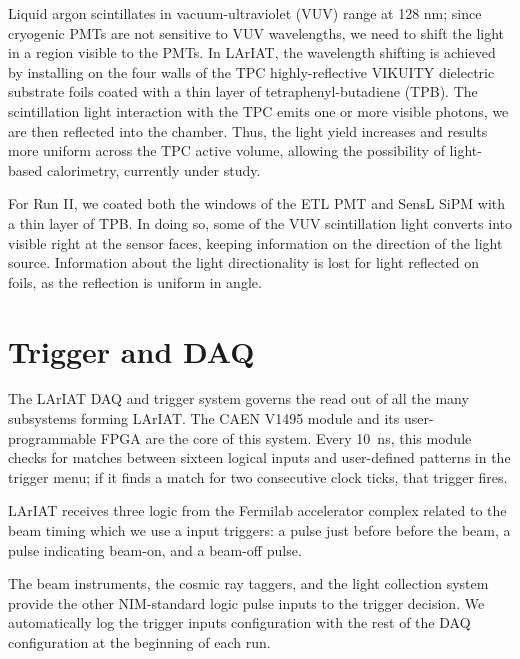 Liquid argon scintillates in vacuum-ultraviolet (VUV) range at 128 nm; since cryogenic PMTs are not sensitive to VUV wavelengths, we need to shift the light in a region visible to the PMTs. In LArIAT, the wavelength shifting is achieved by installing on the four walls of the TPC highly-reflective VIKUITY dielectric substrate foils coated with a thin layer of tetraphenyl-butadiene (TPB). The scintillation light interaction with the TPC emits one or more visible photons, we are then reflected into the chamber. Thus, the light yield increases and results more uniform across the TPC active volume, allowing the possibility of light-based calorimetry, currently under study.

For Run II, we coated both  the windows of the ETL PMT and SensL SiPM  with a thin layer of TPB. In doing so, some of the VUV scintillation light converts into visible right at the sensor faces, keeping information on the direction of the light source. Information about the light directionality is lost for light reflected on foils, as the reflection is uniform in angle. %



\section{Trigger and DAQ}
The LArIAT DAQ and trigger system governs the read out of all the many subsystems forming LArIAT. 
The CAEN V1495 module and its user-programmable FPGA  are the core of this system.  Every 10~ns, this module checks for matches between sixteen logical inputs and user-defined patterns in the trigger menu; if it finds a match for two consecutive clock ticks, that trigger fires.

LArIAT receives three logic from the Fermilab accelerator complex related to the beam timing which we use a input triggers: a pulse just before before the beam, a pulse indicating beam-on, and a beam-off pulse.

The beam instruments,  the cosmic ray taggers, and the light collection system provide the other NIM-standard logic pulse inputs to the trigger decision. We automatically log the trigger inputs configuration with the rest of the DAQ configuration at the beginning of each run.

